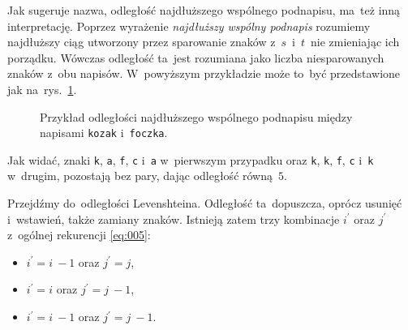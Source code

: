 \documentclass{praca1}
\begin{document}
Jak sugeruje nazwa, odległość najdłuższego wspólnego podnapisu, ma~też inną interpretację. Poprzez wyrażenie \emph{najdłuższy wspólny podnapis} rozumiemy najdłuższy ciąg utworzony przez sparowanie znaków z~$s$~i~$t$~nie zmieniając ich porządku. Wówczas odległość ta~jest rozumiana jako liczba niesparowanych znaków z~obu napisów. W~powyższym przykładzie może to~być przedstawione jak na~rys.~\ref{rys:003}.
	
	

\begin{figure}[width=80pt]
\centering
{}
\cprotect\caption{Przykład odległości najdłuższego wspólnego podnapisu między napisami \verb|kozak| i~\verb|foczka|.}\label{rys:003}
\end{figure}

Jak widać, znaki \verb|k|, \verb|a|, \verb|f|, \verb|c| i~\verb|a| w~pierwszym przypadku oraz \verb|k|, \verb|k|, \verb|f|, \verb|c| i~\verb|k| w~drugim, pozostają bez pary, dając odległość równą~$5$.





Przejdźmy do~odległości Levenshteina. Odległość ta~dopuszcza, oprócz usunięć i~wstawień, także zamiany znaków. Istnieją zatem  trzy kombinacje $i^\prime$ oraz $j^\prime$ z~ogólnej rekurencji \eqref{eq:005}:
\begin{itemize}
\item $i^\prime = i~- 1$ oraz $j^\prime = j$,
\item $i^\prime = i$ oraz $j^\prime = j~- 1$,
\item $i^\prime = i~- 1$ oraz $j^\prime = j~- 1$.
\end{itemize}
\end{document}
